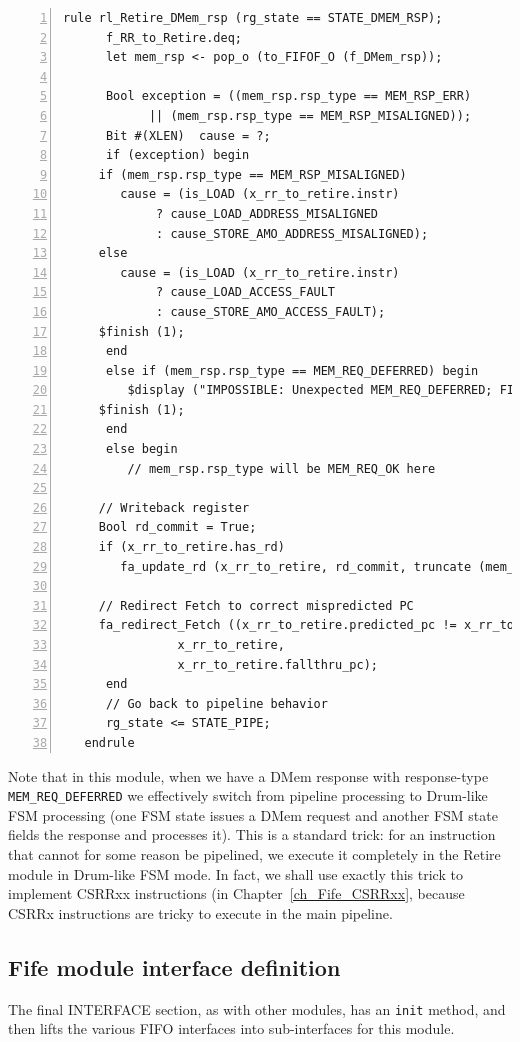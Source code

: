 {\small
\begin{Verbatim}[frame=single, numbers=left, label=(In file:src\_Fife/S5\_Retire.bsv)]
   rule rl_Retire_DMem_rsp (rg_state == STATE_DMEM_RSP);
      f_RR_to_Retire.deq;
      let mem_rsp <- pop_o (to_FIFOF_O (f_DMem_rsp));

      Bool exception = ((mem_rsp.rsp_type == MEM_RSP_ERR)
			|| (mem_rsp.rsp_type == MEM_RSP_MISALIGNED));
      Bit #(XLEN)  cause = ?;
      if (exception) begin
	 if (mem_rsp.rsp_type == MEM_RSP_MISALIGNED)
	    cause = (is_LOAD (x_rr_to_retire.instr)
		     ? cause_LOAD_ADDRESS_MISALIGNED
		     : cause_STORE_AMO_ADDRESS_MISALIGNED);
	 else
	    cause = (is_LOAD (x_rr_to_retire.instr)
		     ? cause_LOAD_ACCESS_FAULT
		     : cause_STORE_AMO_ACCESS_FAULT);
	 $finish (1);
      end
      else if (mem_rsp.rsp_type == MEM_REQ_DEFERRED) begin
         $display ("IMPOSSIBLE: Unexpected MEM_REQ_DEFERRED; FINISH.");
	 $finish (1);
      end
      else begin
      	 // mem_rsp.rsp_type will be MEM_REQ_OK here

	 // Writeback register
	 Bool rd_commit = True;
	 if (x_rr_to_retire.has_rd)
	    fa_update_rd (x_rr_to_retire, rd_commit, truncate (mem_rsp.data));

	 // Redirect Fetch to correct mispredicted PC
	 fa_redirect_Fetch ((x_rr_to_retire.predicted_pc != x_rr_to_retire.fallthru_pc),
			    x_rr_to_retire,
			    x_rr_to_retire.fallthru_pc);
      end
      // Go back to pipeline behavior
      rg_state <= STATE_PIPE;
   endrule
\end{Verbatim}
}

Note that in this module, when we have a DMem response with
response-type \verb|MEM_REQ_DEFERRED| we effectively switch from
pipeline processing to Drum-like FSM processing (one FSM state issues
a DMem request and another FSM state fields the response and processes
it).  This is a standard trick: for an instruction that cannot for
some reason be pipelined, we execute it completely in the Retire
module in Drum-like FSM mode.  In fact, we shall use exactly this
trick to implement CSRRxx instructions (in
Chapter~\ref{ch_Fife_CSRRxx}, because CSRRx instructions are tricky to
execute in the main pipeline.


\subsection{Fife module interface definition}

The final INTERFACE section, as with other modules, has an \verb|init|
method, and then lifts the various FIFO interfaces into sub-interfaces
for this module.



